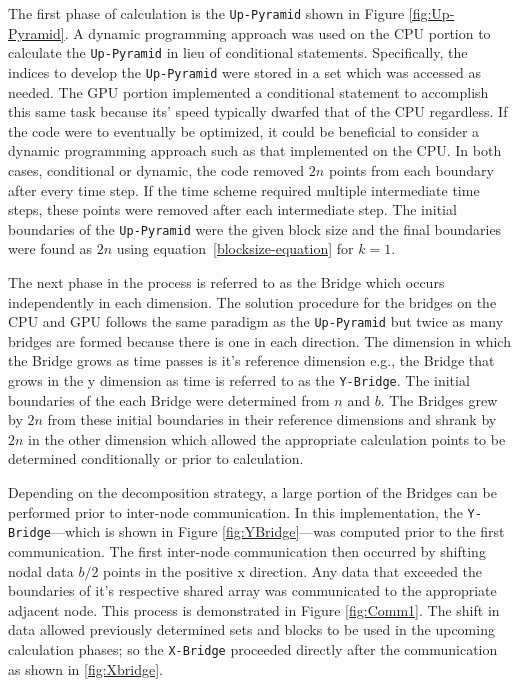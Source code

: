 \documentclass[review]{elsarticle}
\def\Up{\texttt{Up-Pyramid}}
\def\Xb{\texttt{X-Bridge}}
\def\Yb{\texttt{Y-Bridge}}
\begin{document}
\par
The first phase of calculation is the \Up{} shown in Figure \ref{fig:Up-Pyramid}. A dynamic programming approach was used on the CPU portion to calculate the \Up{} in lieu of conditional statements. Specifically, the indices to develop the \Up{} were stored in a set which was accessed as needed. The GPU portion implemented a conditional statement to accomplish this same task because its' speed typically dwarfed that of the CPU regardless. If the code were to eventually be optimized, it could be beneficial to consider a dynamic programming approach such as that implemented on the CPU. In both cases, conditional or dynamic, the code removed $2n$ points from each boundary after every time step. If the time scheme required multiple intermediate time steps, these points were removed after each intermediate step. The initial boundaries of the \Up{} were the given block size and the final boundaries were found as $2n$ using equation~\ref{blocksize-equation} for $k=1$.

\par The next phase in the process is referred to as the Bridge which occurs independently in each dimension. The solution procedure for the bridges on the CPU and GPU follows the same paradigm as the \Up{} but twice as many bridges are formed because there is one in each direction. The dimension in which the Bridge grows as time passes is it's reference dimension e.g., the Bridge that grows in the y dimension as time is referred to as the \Yb{}. The initial boundaries of the each Bridge were determined from $n$ and $b$. The Bridges grew by $2n$ from these initial boundaries in their reference dimensions and shrank by $2n$ in the other dimension which allowed the appropriate calculation points to be determined conditionally or prior to calculation.

\par
Depending on the decomposition strategy, a large portion of the Bridges can be performed prior to inter-node communication. In this implementation, the \Yb{}---which is shown in Figure \ref{fig:YBridge}---was computed prior to the first communication. The first inter-node communication then occurred by shifting nodal data $b/2$ points in the positive x direction. Any data that exceeded the boundaries of it's respective shared array was communicated to the appropriate adjacent node. This process is demonstrated in Figure \ref{fig:Comm1}. The shift in data allowed previously determined sets and blocks to be used in the upcoming calculation phases; so the \Xb{} proceeded directly after the communication as shown in \ref{fig:Xbridge}.
\end{document}
